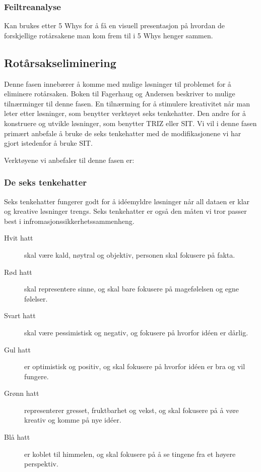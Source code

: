 \subsubsection{Feiltreanalyse} 
Kan brukes etter 5 Whys for å få en visuell presentasjon på hvordan de forskjellige rotårsakene man kom frem til i 5 Whys henger sammen.


\subsection{Rotårsakseliminering}
Denne fasen innebærer å komme med mulige løsninger til problemet for å eliminere rotårsaken. Boken til Fagerhaug og Andersen \cite{RCA} beskriver to mulige tilnærminger til denne fasen. En tilnærming for å stimulere kreativitet når man leter etter løsninger, som benytter verktøyet seks tenkehatter. Den andre for å konstruere og utvikle løsninger, som benytter TRIZ eller SIT. Vi vil i denne fasen primært anbefale å bruke de seks tenkehatter med de modifikasjonene vi har gjort istedenfor å bruke SIT.

Verktøyene vi anbefaler til denne fasen er:
\subsubsection{De seks tenkehatter} 
Seks tenkehatter fungerer godt for å idéemyldre løsninger når all dataen er klar og kreative løsninger trengs. Seks tenkehatter er også den måten vi tror passer best i infromasjonssikkerhetssammenheng.
\begin{description}
    \item[Hvit hatt] skal være kald, nøytral og objektiv, personen skal fokusere på fakta.
    \item[Rød hatt] skal representere sinne, og skal bare fokusere på magefølelsen og egne følelser.
    \item[Svart hatt] skal være pessimistisk og negativ, og fokusere på hvorfor idéen er dårlig.
    \item[Gul hatt] er optimistisk og positiv, og skal fokusere på hvorfor idéen er bra og vil fungere.
    \item[Grønn hatt] representerer gresset, fruktbarhet og vekst, og skal fokusere på å vøre kreativ og komme på nye idéer.
    \item[Blå hatt] er koblet til himmelen, og skal fokusere på å se tingene fra et høyere perspektiv.
\end{description}

